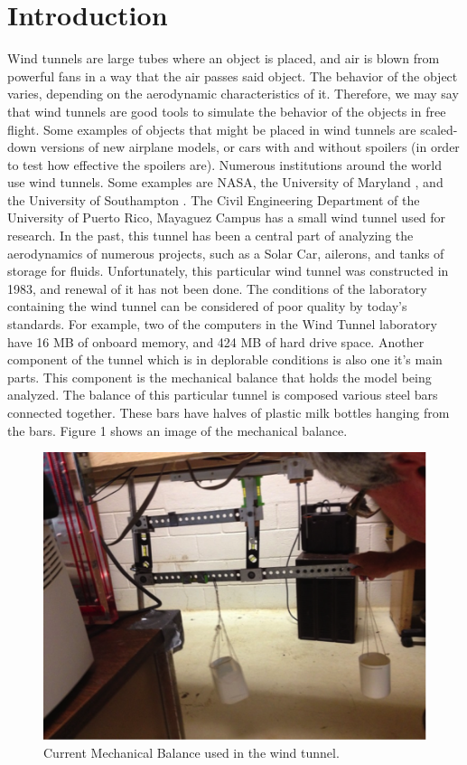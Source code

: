 \section{Introduction}
		Wind tunnels \cite{ref:intro1} are large tubes where an object is placed, and air is blown from 
		powerful fans in a way that the air passes said object. The behavior of the object 
		varies, depending on the aerodynamic characteristics of it. Therefore, we may say 
		that wind tunnels are good tools to simulate the behavior of the objects in free 
		flight. Some examples of objects that might be placed in wind tunnels are scaled-down 
		versions of new airplane models, or cars with and without spoilers (in order to test
		how effective the spoilers are). Numerous institutions around the world use wind tunnels. 
		Some examples are NASA, the University of Maryland \cite{ref:intro2}, and the University 
		of Southampton \cite{ref:intro3}. The Civil Engineering Department of the University of 
		Puerto Rico, Mayaguez Campus \cite{ref:intro4} has a small wind tunnel used for research. 
		In the past, this tunnel has been a central part of analyzing the aerodynamics of numerous
		projects, such as a Solar Car, ailerons, 
		and tanks of storage for fluids. Unfortunately, this particular wind tunnel was constructed in 1983, and renewal of it has not been done. The conditions of the laboratory 
		containing the wind tunnel can be considered of poor quality by today’s standards. 
		For example, two of the computers in the Wind Tunnel laboratory have 16 MB of onboard 
		memory, and 424 MB of hard drive space. Another component of the tunnel which is in 
		deplorable conditions is also one it’s main parts. This component is the 
		mechanical balance that holds the model being analyzed. The balance of this particular
		tunnel is composed various steel bars connected together. These bars have halves of 
		plastic milk bottles hanging from the bars.  Figure 1 shows an image of the mechanical balance.

		\begin{figure}[H]
			\centering
				\includegraphics[scale=0.7]{img/intro-1}
			\caption{Current Mechanical Balance used in the wind tunnel.}
		\end{figure}

